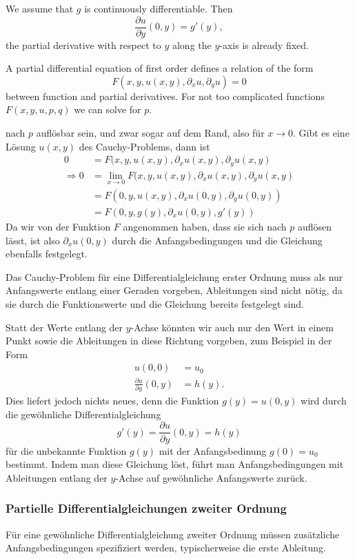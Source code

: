 We assume that $g$ is continuously differentiable.
Then
\[
\frac{\partial u}{\partial y}(0, y)=g'(y),
\]
the partial derivative with respect to $y$ along the $y$-axis is already
fixed.

A partial differential equation of first order defines a relation
of the form
\[
F(x,y,u(x,y), \partial_x u, \partial_y u)=0
\]
between function and partial derivatives.
For not too complicated functions $F(x,y,u,p,q)$ we can solve for
$p$.

%
%

nach $p$ auflösbar sein, und zwar sogar auf dem Rand, also für
$x\to 0$. Gibt es eine Lösung $u(x,y)$ des Cauchy-Problems, dann
ist 
\begin{align*}
0&=
F(x,y,u(x,y), \partial_x u(x,y), \partial_y u(x,y)
\\
\Rightarrow
0&=
\lim_{x\to 0}
F(x,y,u(x,y), \partial_x u(x,y), \partial_y u(x,y)\\
&=F(0,y,u(x,y),\partial_x u(0,y), \partial_y u(0,y))
\\
&=
F(0,y,g(y),\partial_x u(0,y), g'(y))
\end{align*}
Da wir von der Funktion $F$ angenommen haben, dass sie sich
nach $p$ auflösen lässt, ist also $\partial_x u(0,y)$ durch
die Anfangsbedingungen und die Gleichung ebenfalls festgelegt.

Das Cauchy-Problem für eine Differentialgleichung erster Ordnung
muss als nur Anfangswerte entlang einer Geraden vorgeben, Ableitungen
sind nicht nötig, da sie durch die Funktionswerte und die Gleichung
bereits festgelegt sind.

Statt der Werte entlang der $y$-Achse könnten wir auch nur den
Wert in einem Punkt sowie die Ableitungen
in diese Richtung vorgeben, zum Beispiel in der Form
\begin{align*}
u(0,0)&=u_0\\
\frac{\partial u}{\partial y}(0,y)&=h(y).
\end{align*}
Dies liefert jedoch nichts neues, denn die Funktion $g(y)=u(0,y)$
wird durch die gewöhnliche Differentialgleichung
\[
g'(y)=\frac{\partial u}{\partial y}(0,y)=h(y)
\]
für die unbekannte Funktion $g(y)$
mit der Anfangsbedinung $g(0)=u_0$ bestimmt.
Indem man diese Gleichung löst, führt man Anfangsbedingungen
mit Ableitungen entlang der $y$-Achse auf gewöhnliche
Anfangswerte zurück.

\subsubsection{Partielle Differentialgleichungen zweiter Ordnung}
Für eine gewöhnliche Differentialgleichung zweiter Ordnung müssen
zusätzliche Anfangsbedingungen spezifiziert werden, typischerweise
die erste Ableitung.

